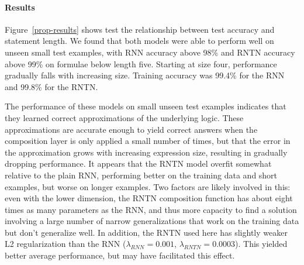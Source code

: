\paragraph{Results} Figure~\ref{prop-results} shows test the relationship
between test accuracy and statement length. We found that both 
models were able to perform well on unseen small test examples, 
with RNN accuracy above
98\% and RNTN accuracy above 99\% on formulae below length five.
Starting at size four, performance gradually falls with increasing
size. Training accuracy was 99.4\% for the RNN and 99.8\% for the RNTN.

The performance of these models on small unseen test examples
indicates that they learned correct approximations of the underlying
logic. These approximations are accurate enough to yield
correct answers when the composition layer is only applied a small
number of times, but that the error in the approximation grows with
increasing expression size, resulting in gradually dropping performance. 
It appears that the RNTN model overfit somewhat relative to the plain RNN,
performing better on the training data and short examples, but worse on longer
examples. Two factors are likely involved in this: even with the lower dimension,
the RNTN composition function has about eight times as many parameters as the
RNN, and thus more capacity to find a solution involving a large number of narrow 
generalizations that work on the training data but don't generalize well. In addition,
the RNTN used here has slightly weaker L2 regularization than the 
RNN ($\lambda_{\textit{RNN}} = 0.001$, $\lambda_{\textit{RNTN}} = 0.0003$). This
yielded better average performance, but may have facilitated this effect.


